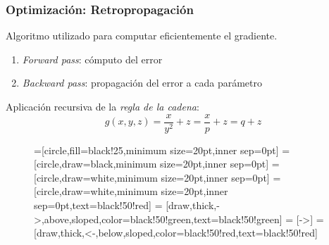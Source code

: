 \documentclass{beamer}
\begin{document}
\begin{frame}[plain]
\frametitle{Optimización: Retropropagación}
\vfill
Algoritmo utilizado para computar eficientemente el gradiente.
\vfill
\begin{enumerate}
    \item \textit{Forward pass}: cómputo del error
    \item \textit{Backward pass}: propagación del error a cada parámetro
\end{enumerate}
\vfill
Aplicación recursiva de la \textit{regla de la cadena}:
\vfill
\begin{equation}
    g(x,y,z) = \frac{x}{y^2} + z = \frac{x}{p} + z = q + z
\end{equation}
\vfill
\begin{figure}[H]
    \centering
    =[circle,fill=black!25,minimum size=20pt,inner sep=0pt]
    =[circle,draw=black,minimum size=20pt,inner sep=0pt]
    =[circle,draw=white,minimum size=20pt,inner sep=0pt]
    =[circle,draw=white,minimum size=20pt,inner sep=0pt,text=black!50!red]
     = [draw,thick,->,above,sloped,color=black!50!green,text=black!50!green]
     = [->]
     = [draw,thick,<-,below,sloped,color=black!50!red,text=black!50!red]
\end{figure}
\end{frame}
\end{document}
